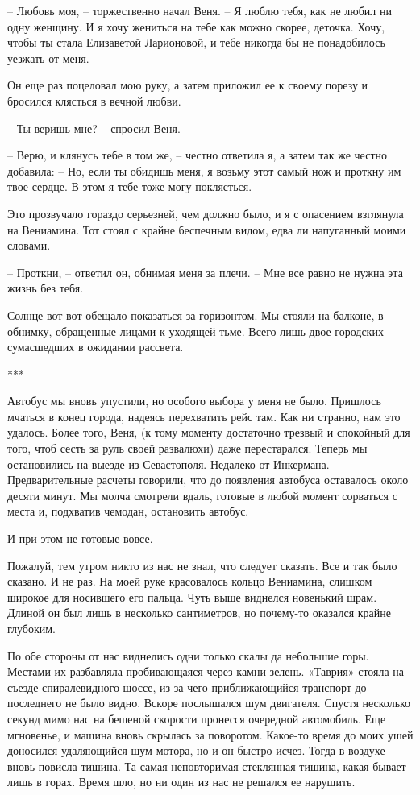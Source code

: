\documentclass[
]{book}
\begin{document}
-- Любовь моя, -- торжественно начал Веня. -- Я люблю тебя, как не любил ни одну женщину. И я хочу жениться на тебе как можно скорее, деточка. Хочу, чтобы ты стала Елизаветой Ларионовой, и тебе никогда бы не понадобилось уезжать от меня.

Он еще раз поцеловал мою руку, а затем приложил ее к своему порезу и бросился клясться в вечной любви.

-- Ты веришь мне? -- спросил Веня.

-- Верю, и клянусь тебе в том же, -- честно ответила я, а затем так же честно добавила: -- Но, если ты обидишь меня, я возьму этот самый нож и проткну им твое сердце. В этом я тебе тоже могу поклясться.

Это прозвучало гораздо серьезней, чем должно было, и я с опасением взглянула на Вениамина. Тот стоял с крайне беспечным видом, едва ли напуганный моими словами.

-- Проткни, -- ответил он, обнимая меня за плечи. -- Мне все равно не нужна эта жизнь без тебя.

Солнце вот-вот обещало показаться за горизонтом. Мы стояли на балконе, в обнимку, обращенные лицами к уходящей тьме. Всего лишь двое городских сумасшедших в ожидании рассвета.

***

Автобус мы вновь упустили, но особого выбора у меня не было. Пришлось мчаться в конец города, надеясь перехватить рейс там. Как ни странно, нам это удалось. Более того, Веня, (к тому моменту достаточно трезвый и спокойный для того, чтоб сесть за руль своей развалюхи) даже перестарался. Теперь мы остановились на выезде из Севастополя. Недалеко от Инкермана. Предварительные расчеты говорили, что до появления автобуса оставалось около десяти минут. Мы молча смотрели вдаль, готовые в любой момент сорваться с места и, подхватив чемодан, остановить автобус.

И при этом не готовые вовсе.

Пожалуй, тем утром никто из нас не знал, что следует сказать. Все и так было сказано. И не раз. На моей руке красовалось кольцо Вениамина, слишком широкое для носившего его пальца. Чуть выше виднелся новенький шрам. Длиной он был лишь в несколько сантиметров, но почему-то оказался крайне глубоким.

По обе стороны от нас виднелись одни только скалы да небольшие горы. Местами их разбавляла пробивающаяся через камни зелень. «Таврия» стояла на съезде спиралевидного шоссе, из-за чего приближающийся транспорт до последнего не было видно. Вскоре послышался шум двигателя. Спустя несколько секунд мимо нас на бешеной скорости пронесся очередной автомобиль. Еще мгновенье, и машина вновь скрылась за поворотом. Какое-то время до моих ушей доносился удаляющийся шум мотора, но и он быстро исчез. Тогда в воздухе вновь повисла тишина. Та самая неповторимая стеклянная тишина, какая бывает лишь в горах. Время шло, но ни один из нас не решался ее нарушить.
\end{document}
